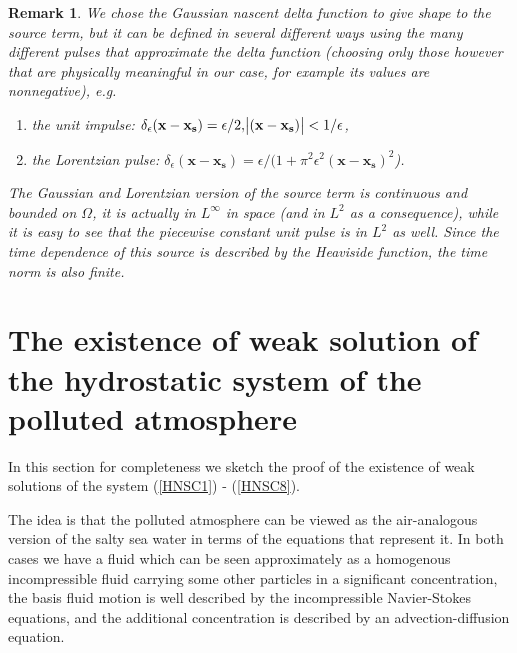 \documentclass[11pt]{article}
\newtheorem{remark}{Remark}
\begin{document}
\begin{remark}
\normalfont We chose the Gaussian nascent delta function to give shape to the source term, but it can be defined in several different ways using the many different pulses that approximate the delta function (choosing only those however that are physically meaningful in our case, for example its values are nonnegative), e.g.

  \begin{enumerate}
  
    \item the unit impulse: $\delta_\epsilon (\mathbf{x}-\mathbf{x_s}) = \epsilon/2, \abs{(\mathbf{x}-\mathbf{x_s})} < 1/\epsilon $,
  
    \item the Lorentzian pulse: $\delta_\epsilon (\mathbf{x}-\mathbf{x_s}) = \epsilon / (1 + \pi^2 \epsilon^2 (\mathbf{x}-\mathbf{x_s})^2$).

  \end{enumerate}
  
  The Gaussian and Lorentzian version of the source term is continuous and bounded on $\Omega$, it is actually in $L^\infty$ in space (and in $L^2$ as a consequence), while it is easy to see that the piecewise constant unit pulse is in $L^2$ as well. Since the time dependence of this source is described by the Heaviside function, the time norm is also finite.
  
\end{remark}

\appendix

\section{The existence of weak solution of the hydrostatic system of the polluted atmosphere}

In this section for completeness we sketch the proof of the existence of weak solutions of the system (\ref{HNSC1}) - (\ref{HNSC8}).

The idea is that the polluted atmosphere can be viewed as the air-analogous version of the salty sea water in terms of the equations that represent it. In both cases we have a fluid which can be seen approximately as a homogenous incompressible fluid carrying some other particles in a significant concentration, the basis fluid motion is well described by the incompressible Navier-Stokes equations, and the additional concentration is described by an advection-diffusion equation. 
\end{document}
